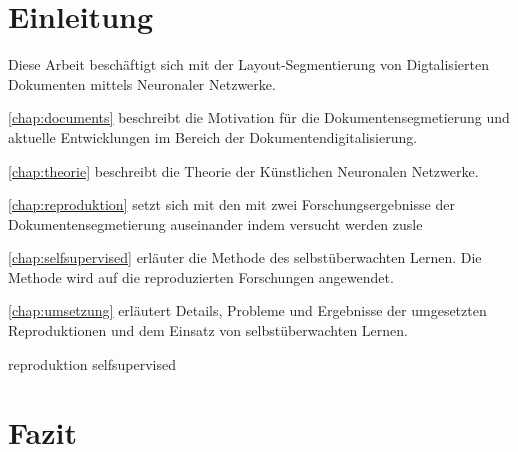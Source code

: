 

\section*{Einleitung}
Diese Arbeit beschäftigt sich mit der Layout-Segmentierung von Digtalisierten Dokumenten mittels Neuronaler Netzwerke.

\cref{chap:documents} beschreibt die Motivation für die Dokumentensegmetierung und aktuelle Entwicklungen im
Bereich der Dokumentendigitalisierung.

\cref{chap:theorie} beschreibt die Theorie der Künstlichen Neuronalen Netzwerke.

\cref{chap:reproduktion} setzt sich mit den mit zwei Forschungsergebnisse der Dokumentensegmetierung auseinander indem 
versucht werden zusle

\cref{chap:selfsupervised} erläuter die Methode des selbstüberwachten Lernen. Die Methode wird auf die reproduzierten Forschungen angewendet.

\cref{chap:umsetzung} erläutert Details, Probleme und Ergebnisse der umgesetzten
Reproduktionen und dem Einsatz von selbstüberwachten Lernen.



{reproduktion}
{selfsupervised}


\section{Fazit}


